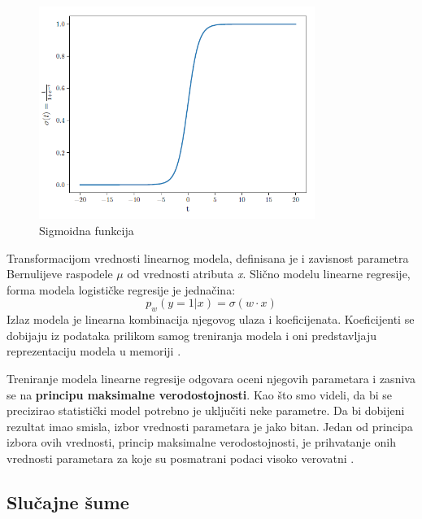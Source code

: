 \documentclass[12pt,oneside]{memoir}
\begin{document}
\begin{figure}[!ht]
  \centering
  \includegraphics[width=0.8\textwidth]{sigma.png}
  \caption{Sigmoidna funkcija}
  \label{fig:sigmagraph}
\end{figure}

Transformacijom vrednosti linearnog modela, definisana je i zavisnost parametra Bernulijeve raspodele $\mu$ od vrednosti atributa \textit{x}. Slično modelu linearne regresije, forma modela logističke regresije je jednačina: $$  p_w (y=1|x) = \sigma(w \cdot x) $$Izlaz modela je linearna kombinacija njegovog ulaza i koeficijenata. Koeficijenti se dobijaju iz podataka prilikom samog treniranja modela i oni predstavljaju reprezentaciju modela u memoriji \cite{mladen, mlm}.

Treniranje modela linearne regresije odgovara oceni njegovih parametara i zasniva se na \textbf{principu maksimalne verodostojnosti}. Kao što smo videli, da bi se precizirao statistički model potrebno je uključiti neke parametre. Da bi dobijeni rezultat imao smisla, izbor vrednosti parametara je jako bitan. Jedan od principa izbora ovih vrednosti, princip maksimalne verodostojnosti, je prihvatanje onih vrednosti parametara za koje su posmatrani podaci visoko verovatni \cite{mladen}.

\subsection{Slučajne šume}
\label{sec:randfor}
\end{document}
